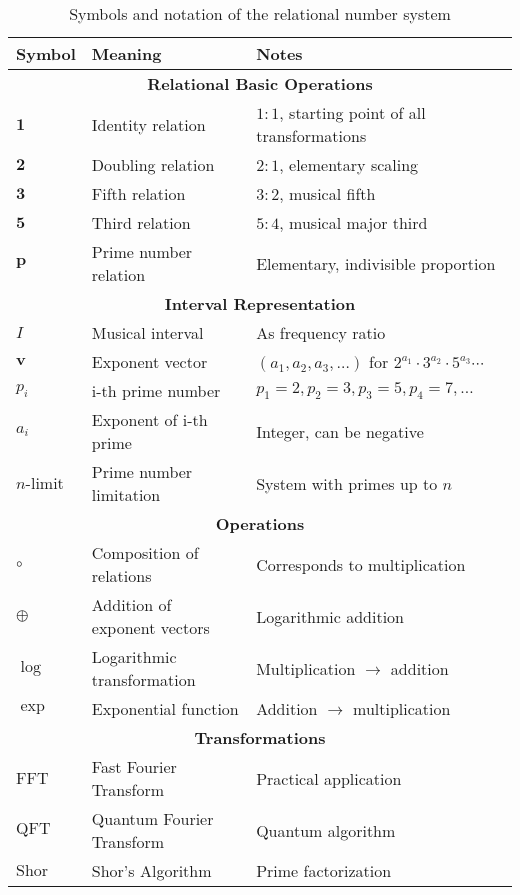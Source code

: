 \documentclass[11pt,a4paper]{article}
\newcommand{\primrel}[1]{\mathbf{#1}}
\newcommand{\vect}[1]{\boldsymbol{#1}}
\begin{document}
	{\small
		\begin{table}[htbp]
			\centering
			\begin{adjustbox}{width=0.98\textwidth}
				\begin{tabular}{lll}
					\toprule
					\textbf{Symbol} & \textbf{Meaning} & \textbf{Notes} \\
					\midrule
					\multicolumn{3}{c}{\textbf{Relational Basic Operations}} \\
					$\primrel{1}$ & Identity relation & $1:1$, starting point of all transformations \\
					$\primrel{2}$ & Doubling relation & $2:1$, elementary scaling \\
					$\primrel{3}$ & Fifth relation & $3:2$, musical fifth \\
					$\primrel{5}$ & Third relation & $5:4$, musical major third \\
					$\primrel{p}$ & Prime number relation & Elementary, indivisible proportion \\
					\midrule
					\multicolumn{3}{c}{\textbf{Interval Representation}} \\
					$I$ & Musical interval & As frequency ratio \\
					$\vect{v}$ & Exponent vector & $(a_1, a_2, a_3, \ldots)$ for $2^{a_1} \cdot 3^{a_2} \cdot 5^{a_3} \cdots$ \\
					$p_i$ & i-th prime number & $p_1=2, p_2=3, p_3=5, p_4=7, \ldots$ \\
					$a_i$ & Exponent of i-th prime & Integer, can be negative \\
					$n\text{-limit}$ & Prime number limitation & System with primes up to $n$ \\
					\midrule
					\multicolumn{3}{c}{\textbf{Operations}} \\
					$\circ$ & Composition of relations & Corresponds to multiplication \\
					$\oplus$ & Addition of exponent vectors & Logarithmic addition \\
					$\log$ & Logarithmic transformation & Multiplication $\to$ addition \\
					$\exp$ & Exponential function & Addition $\to$ multiplication \\
					\midrule
					\multicolumn{3}{c}{\textbf{Transformations}} \\
					$\text{FFT}$ & Fast Fourier Transform & Practical application \\
					$\text{QFT}$ & Quantum Fourier Transform & Quantum algorithm \\
					$\text{Shor}$ & Shor's Algorithm & Prime factorization \\
					\bottomrule
				\end{tabular}
			\end{adjustbox}
			\caption{Symbols and notation of the relational number system}
			\label{tab:symbole}
		\end{table}
	}
	
\end{document}
